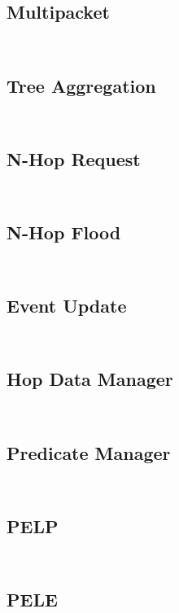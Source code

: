 \documentclass[a4paper,notitlepage]{article}
\newcommand{\sourcecode}[3]{%
\inputminted[linenos=true,tabsize=4,fontsize=\small,frame=lines,framesep=2mm]{c}{#1/#2}
\inputminted[linenos=true,tabsize=4,fontsize=\small,frame=lines,framesep=2mm]{c}{#1/#3}
}
\begin{document}
\subsection{Multipacket}
\sourcecode{../Algorithms/Common/net}{multipacket.h}{multipacket.c}

\subsection{Tree Aggregation}
\sourcecode{../Algorithms/Common/net}{tree-aggregator.h}{tree-aggregator.c}

\subsection{N-Hop Request}
\sourcecode{../Algorithms/Common/net}{nhopreq.h}{nhopreq.c}

\subsection{N-Hop Flood}
\sourcecode{../Algorithms/Common/net}{nhopflood.h}{nhopflood.c}

\subsection{Event Update}
\sourcecode{../Algorithms/Common/net}{eventupdate.h}{eventupdate.c}

\subsection{Hop Data Manager}
\sourcecode{../Algorithms/PredEval}{hop-data-manager.h}{hop-data-manager.c}

\subsection{Predicate Manager}
\sourcecode{../Algorithms/PredEval}{predicate-manager.h}{predicate-manager.c}

\subsection{PELP}
\sourcecode{../Algorithms/PredEvalLocalPeriodic}{pelp.h}{pelp.c}

\subsection{PELE}
\sourcecode{../Algorithms/PredEvalLocalEvent}{pele.h}{pele.c}
\end{document}
